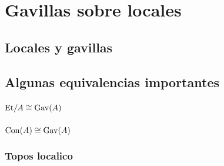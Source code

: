 \chapter{Gavillas sobre locales}

\section{Locales y gavillas}

\section{Algunas equivalencias importantes}

\subsection{${\mathrm{Et}}/A\cong{\mathrm{Gav}}(A)$}

\subsection{${\mathrm{Con}}(A)\cong {\mathrm{Gav}}(A)$}

\subsection{Topos localico}
